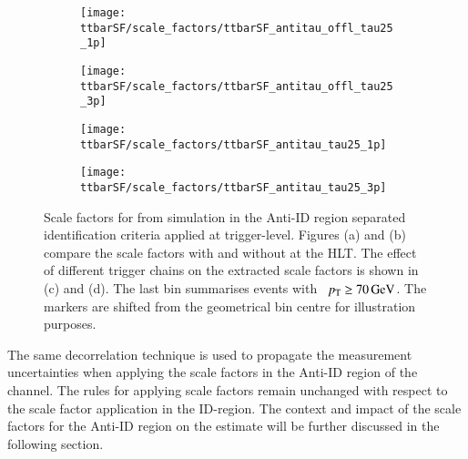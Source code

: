 \begin{figure}[htbp]
  \centering

  \begin{subfigure}[t]{.495\textwidth}
    \texttt{[image: ttbarSF/scale\_factors/ttbarSF\_antitau\_offl\_tau25\_1p]}
    \caption{}
    \label{fig:ttbarSF_antiid_SF_a}
  \end{subfigure}\hfill%
  \begin{subfigure}[t]{.495\textwidth}
    \texttt{[image: ttbarSF/scale\_factors/ttbarSF\_antitau\_offl\_tau25\_3p]}
    \caption{}
    \label{fig:ttbarSF_antiid_SF_b}
  \end{subfigure}

  \begin{subfigure}[t]{.495\textwidth}
    \texttt{[image: ttbarSF/scale\_factors/ttbarSF\_antitau\_tau25\_1p]}
    \caption{}
    \label{fig:ttbarSF_antiid_SF_c}
  \end{subfigure}\hfill%
  \begin{subfigure}[t]{.495\textwidth}
    \texttt{[image: ttbarSF/scale\_factors/ttbarSF\_antitau\_tau25\_3p]}
    \caption{}
    \label{fig:ttbarSF_antiid_SF_d}
  \end{subfigure}

  \caption{Scale factors for \faketauhadvis from \ttbar simulation in
    the Anti-ID region separated \tauhadvis identification criteria
    applied at trigger-level. Figures (a) and (b) compare the scale
    factors with and without \tauid at the HLT. The effect of
    different \tauhadvis trigger chains on the extracted scale factors
    is shown in (c) and (d). The last bin summarises events with
    \tauhadvis~$\pT \geq \SI{70}{\GeV}$. The markers are shifted from
    the geometrical bin centre for illustration purposes.}%
  \label{fig:ttbarSF_antiid_SF}
\end{figure}

The same decorrelation technique is used to propagate the measurement
uncertainties when applying the scale factors in the Anti-ID region of
the \hadhad channel. The rules for applying scale factors remain
unchanged with respect to the scale factor application in the
ID-region. The context and impact of the scale factors for the Anti-ID
region on the \multijet estimate will be further discussed in the
following section.




